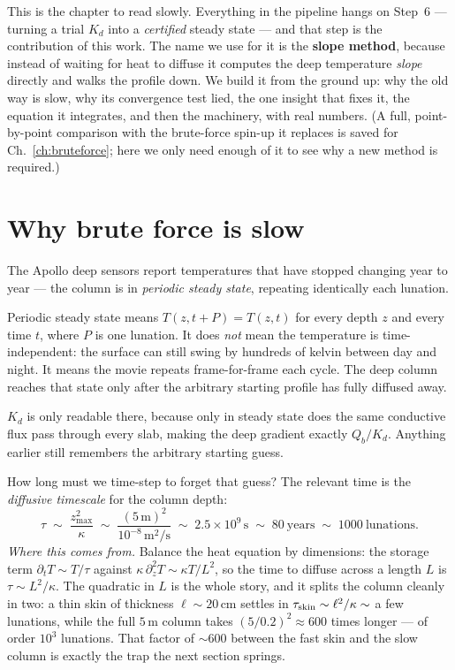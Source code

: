 \documentclass[11pt]{report}
\begin{document}
This is the chapter to read slowly. Everything in the pipeline hangs on Step~6 ---
turning a trial $K_d$ into a \emph{certified} steady state --- and that step is
the contribution of this work. The name we use for it is the \textbf{slope
method}, because instead of waiting for heat to diffuse it computes the deep
temperature \emph{slope} directly and walks the profile down. We build it from
the ground up: why the old way is slow, why its convergence test lied, the one
insight that fixes it, the equation it integrates, and then the machinery, with
real numbers. (A full, point-by-point comparison with the brute-force spin-up it
replaces is saved for Ch.~\ref{ch:bruteforce}; here we only need enough of it to
see why a new method is required.)

\section{Why brute force is slow}\label{sec:slow}

The Apollo deep sensors report temperatures that have stopped changing year to
year --- the column is in \emph{periodic steady state}, repeating identically
each lunation.

\begin{plain}
Periodic steady state means $T(z,t+P)=T(z,t)$ for every depth $z$ and every
time $t$, where $P$ is one lunation. It does \emph{not} mean the temperature is
time-independent: the surface can still swing by hundreds of kelvin between
day and night. It means the movie repeats frame-for-frame each cycle. The deep
column reaches that state only after the arbitrary starting profile has fully
diffused away.
\end{plain}

$K_d$ is only readable there, because only in steady state does
the same conductive flux pass through every slab, making the deep gradient
exactly $Q_b/K_d$. Anything earlier still remembers the arbitrary starting guess.

How long must we time-step to forget that guess? The relevant time is the
\emph{diffusive timescale} for the column depth:
\begin{equation}
\tau \;\sim\; \frac{z_{\max}^2}{\kappa}
\;\sim\; \frac{(5\,\text{m})^2}{10^{-8}\,\text{m}^2/\text{s}}
\;\sim\; 2.5\!\times\!10^{9}\,\text{s}
\;\sim\; 80\ \text{years}
\;\sim\; 1000\ \text{lunations}.
\label{eq:tau}
\end{equation}
\emph{Where this comes from.} Balance the heat equation by dimensions: the
storage term $\partial_t T\sim T/\tau$ against $\kappa\,\partial_z^2 T\sim\kappa
T/L^2$, so the time to diffuse across a length $L$ is $\tau\sim L^2/\kappa$. The
quadratic in $L$ is the whole story, and it splits the column cleanly in two: a
thin skin of thickness $\ell\sim20$\,cm settles in
$\tau_{\rm skin}\sim\ell^2/\kappa\sim$ a few lunations, while the full $5$\,m
column takes $(5/0.2)^2\approx600$ times longer --- of order $10^3$ lunations.
That factor of $\sim$600 between the fast skin and the slow column is exactly the
trap the next section springs.
\end{document}
